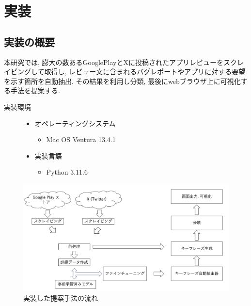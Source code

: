 \chapter{実装}
\label{chap:zisso}


\section{実装の概要}
本研究では, 膨大の数あるGooglePlayとXに投稿されたアプリレビューをスクレイピングして取得し, レビュー文に含まれるバグレポートやアプリに対する要望を示す箇所を自動抽出, その結果を利用し分類, 最後にwebブラウザ上に可視化する手法を提案する. 
\begin{description}
\item[実装環境]\mbox{}
\begin{itemize}
 \item オペレーティングシステム
    \begin{itemize}
      \item Mac OS Ventura 13.4.1
    \end{itemize}
 \item 実装言語
    \begin{itemize}
      \item Python 3.11.6
    \end{itemize}
\end{itemize}
\end{description}


\begin{figure}[hbtp]
 \centering
 \includegraphics[width=\linewidth]
      {contents/images/zisso_nagare.png}
 \caption{実装した提案手法の流れ\label{chap:nagare}}
\end{figure}



